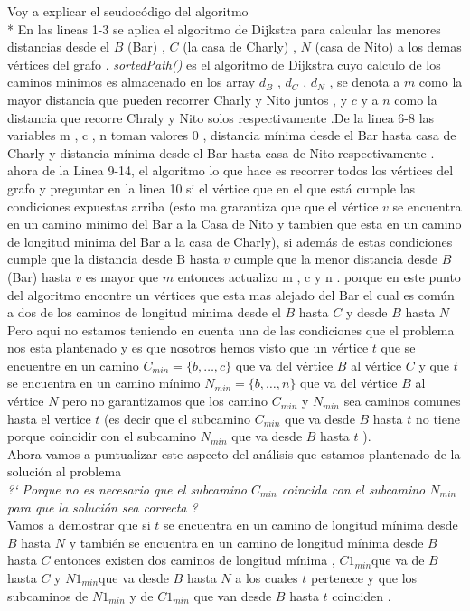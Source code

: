 \documentclass[10pt]{article}
\begin{document}
    \noindent Voy a explicar el seudoc\'odigo del algoritmo 
    \\*
    En las lineas 1-3 se aplica el algoritmo de Dijkstra para calcular las menores distancias desde el $B$ (Bar) , $C$ (la casa de Charly) , $N$ (casa de Nito) a los demas v\'ertices del grafo . 
    \textit{sortedPath()} es el algoritmo de Dijkstra cuyo calculo de los caminos minimos es almacenado en los array $d_B$ , $d_C$ , $d_N$   , se denota a $m$ como la mayor distancia que pueden recorrer Charly y Nito juntos  , y $c$ y a $n$ como la distancia que recorre Chraly y Nito solos respectivamente 
    .De la linea 6-8  las variables m , c , n toman valores 0 , distancia m\'inima desde el Bar hasta casa de Charly y distancia m\'inima desde el Bar hasta casa de Nito respectivamente . ahora de la Linea 9-14, el algoritmo lo que hace es recorrer todos los v\'ertices del grafo y preguntar en la linea 10 si 
    el v\'ertice que en el que est\'a  cumple las condiciones expuestas arriba  (esto ma grarantiza que que el v\'ertice $v$ se encuentra en un camino minimo del Bar a la Casa de Nito y tambien que esta en un camino de longitud minima del Bar a la casa de Charly), si adem\'as de estas condiciones cumple que  
    la distancia desde B hasta $v$ cumple que la menor distancia desde $B$ (Bar) hasta $v$ es mayor que $m$ entonces actualizo m , c y n . porque en este punto del algoritmo encontre un v\'ertices  que esta mas alejado del Bar el cual es com\'un a dos de los caminos de longitud minima desde el $B$ hasta $C$ y desde $B$ hasta $N$
    \\[10pt] 
    Pero aqui no estamos teniendo en cuenta una de las condiciones que el problema nos esta plantenado y es que nosotros hemos visto que un v\'ertice $t$ que se encuentre en un camino $C_{min} = \{b,\dots,c\}$  que va del v\'ertice  $B$ al  v\'ertice $C$ y que $t$ se encuentra en un camino m\'inimo $N_{min} = \{b,\dots,n\}$  que va del v\'ertice  $B$ al  v\'ertice $N$ pero 
    no garantizamos que los camino $C_{min}$ y $N_{min}$ sea caminos comunes hasta el vertice $t$ (es decir que el subcamino  $C_{min} $ que va desde $B$ hasta $t$ no tiene porque coincidir con el subcamino $N_{min} $ que va desde $B$ hasta $t$ ).
    \\[10pt] 
    Ahora vamos a puntualizar este aspecto del an\'alisis que estamos plantenado de la soluci\'on al problema 
    \\[10pt]
    \textit{?` Porque no es necesario que el subcamino $C_{min}$ coincida con el subcamino $N_{min}$ para que la soluci\'on sea correcta ?}
    \\[10pt] 
    Vamos a demostrar que si $t$ se encuentra en un camino de longitud m\'inima desde $B$ hasta $N$ y tambi\'en se encuentra en un camino de longitud m\'inima desde $B$ hasta $C$  entonces existen dos caminos  de longitud m\'inima , $C1_{min}$que va de $B$ hasta $C$ y  $N1_{min}$que va desde $B$ hasta $N$ a los cuales $t$ pertenece y que los subcaminos de $N1_{min}$ y de $C1_{min}$ que van desde $B$ hasta $t$ coinciden .
\end{document}
